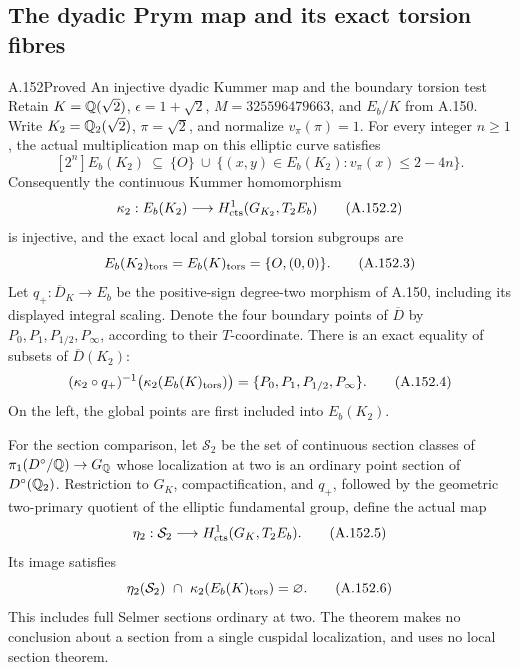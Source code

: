 \subsection{The dyadic Prym map and its exact torsion fibres}

\begin{statement}{A.152}{Proved}
{An injective dyadic Kummer map and the boundary torsion test}
Retain \(K=\Q(\sqrt2)\), \(\epsilon=1+\sqrt2\),
\(M=325596479663\), and \(E_b/K\) from A.150.
Write \(K_2=\Q_2(\sqrt2)\), \(\pi=\sqrt2\),
and normalize \(v_\pi(\pi)=1\).
For every integer \(n\geq1\), the actual multiplication map
on this elliptic curve satisfies
\[
 [2^n]E_b(K_2)\ \subseteq\
 \{O\}\ \cup\
 \{(x,y)\in E_b(K_2):v_\pi(x)\leq2-4n\}.
\tag{A.152.1}
\]
Consequently the continuous Kummer homomorphism
\[
 \kappa_2:E_b(K_2)\longrightarrow
                   H^1_{\rm cts}(G_{K_2},T_2E_b)
\tag{A.152.2}
\]
is injective, and the exact local and global torsion subgroups are
\[
             E_b(K_2)_{\rm tors}=E_b(K)_{\rm tors}=\{O,(0,0)\}.
\tag{A.152.3}
\]
Let \(q_+:\overline D_K\to E_b\) be the positive-sign
degree-two morphism of A.150, including its displayed integral
scaling.  Denote the four boundary points of \(\overline D\)
by \(P_0,P_1,P_{1/2},P_\infty\), according to their
\(T\)-coordinate.  There is an exact equality of subsets
of \(\overline D(K_2)\):
\[
 (\kappa_2\circ q_+)^{-1}
       \bigl(\kappa_2(E_b(K)_{\rm tors})\bigr)
                =\{P_0,P_1,P_{1/2},P_\infty\}.
\tag{A.152.4}
\]
On the left, the global points are first included into
\(E_b(K_2)\).

For the section comparison, let \(\mathscr S_2\) be the set
of continuous section classes of \(\pi_1(D^\circ/\Q)\to G_\Q\)
whose localization at two is an ordinary point section of
\(D^\circ(\Q_2)\).  Restriction to \(G_K\), compactification,
and \(q_+\), followed by the geometric two-primary quotient
of the elliptic fundamental group, define the actual map
\[
 \eta_2:\mathscr S_2\longrightarrow H^1_{\rm cts}(G_K,T_2E_b).
\tag{A.152.5}
\]
Its image satisfies
\[
          \eta_2(\mathscr S_2)\ \cap\
                \kappa_2(E_b(K)_{\rm tors})=\varnothing .
\tag{A.152.6}
\]
This includes full Selmer sections ordinary at two.
The theorem makes no conclusion about a section from a
single cuspidal localization, and uses no local section theorem.
\end{statement}

